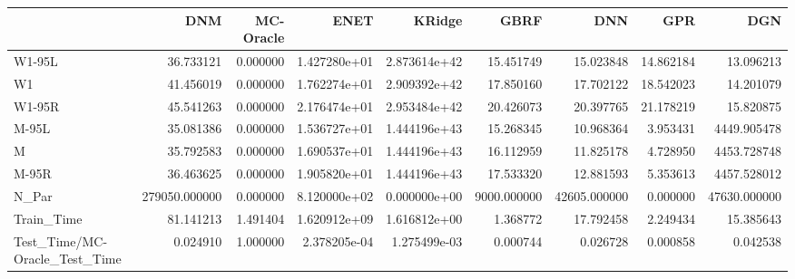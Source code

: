 \begin{tabular}{lrrrrrrrr}
\toprule
{} &            DNM &  MC-Oracle &          ENET &        KRidge &         GBRF &           DNN &        GPR &           DGN \\
\midrule
W1-95L                        &      36.733121 &   0.000000 &  1.427280e+01 &  2.873614e+42 &    15.451749 &     15.023848 &  14.862184 &     13.096213 \\
W1                            &      41.456019 &   0.000000 &  1.762274e+01 &  2.909392e+42 &    17.850160 &     17.702122 &  18.542023 &     14.201079 \\
W1-95R                        &      45.541263 &   0.000000 &  2.176474e+01 &  2.953484e+42 &    20.426073 &     20.397765 &  21.178219 &     15.820875 \\
M-95L                         &      35.081386 &   0.000000 &  1.536727e+01 &  1.444196e+43 &    15.268345 &     10.968364 &   3.953431 &   4449.905478 \\
M                             &      35.792583 &   0.000000 &  1.690537e+01 &  1.444196e+43 &    16.112959 &     11.825178 &   4.728950 &   4453.728748 \\
M-95R                         &      36.463625 &   0.000000 &  1.905820e+01 &  1.444196e+43 &    17.533320 &     12.881593 &   5.353613 &   4457.528012 \\
N\_Par                         &  279050.000000 &   0.000000 &  8.120000e+02 &  0.000000e+00 &  9000.000000 &  42605.000000 &   0.000000 &  47630.000000 \\
Train\_Time                    &      81.141213 &   1.491404 &  1.620912e+09 &  1.616812e+00 &     1.368772 &     17.792458 &   2.249434 &     15.385643 \\
Test\_Time/MC-Oracle\_Test\_Time &       0.024910 &   1.000000 &  2.378205e-04 &  1.275499e-03 &     0.000744 &      0.026728 &   0.000858 &      0.042538 \\
\bottomrule
\end{tabular}
